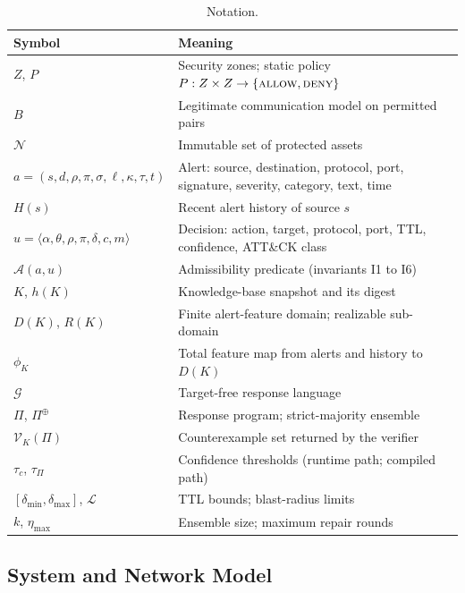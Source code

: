 \documentclass[final,5p]{elsarticle}
\begin{document}
\begin{table}[t]
    \centering
    \caption{Notation.}
    \label{tab:notation}
    \small
    \setlength{\tabcolsep}{4pt}
    \renewcommand{\arraystretch}{1.05}
    \begin{tabularx}{\columnwidth}{@{}lX@{}}
        \toprule
        \textbf{Symbol} & \textbf{Meaning} \\
        \midrule
        $Z$, $P$ & Security zones; static policy $P:Z\times Z\to\{\textsc{allow},\textsc{deny}\}$ \\
        $B$ & Legitimate communication model on permitted pairs \\
        $\mathcal{N}$ & Immutable set of protected assets \\
        $a=(s,d,\rho,\pi,\sigma,\ell,\kappa,\tau,t)$ & Alert: source, destination, protocol, port, signature, severity, category, text, time \\
        $H(s)$ & Recent alert history of source $s$ \\
        $u=\langle\alpha,\theta,\rho,\pi,\delta,c,m\rangle$ & Decision: action, target, protocol, port, TTL, confidence, ATT\&CK class \\
        $\mathcal{A}(a,u)$ & Admissibility predicate (invariants I1 to I6) \\
        $K$, $h(K)$ & Knowledge-base snapshot and its digest \\
        $D(K)$, $R(K)$ & Finite alert-feature domain; realizable sub-domain \\
        $\phi_K$ & Total feature map from alerts and history to $D(K)$ \\
        $\mathcal{G}$ & Target-free response language \\
        $\Pi$, $\Pi^{\oplus}$ & Response program; strict-majority ensemble \\
        $\mathcal{V}_K(\Pi)$ & Counterexample set returned by the verifier \\
        $\tau_c$, $\tau_\Pi$ & Confidence thresholds (runtime path; compiled path) \\
        $[\delta_{\min},\delta_{\max}]$, $\mathcal{L}$ & TTL bounds; blast-radius limits \\
        $k$, $\eta_{\max}$ & Ensemble size; maximum repair rounds \\
        \bottomrule
    \end{tabularx}
\end{table}

\subsection{System and Network Model}
\label{sec:system_model}
\end{document}
